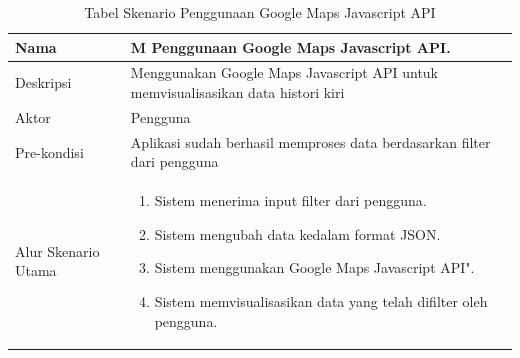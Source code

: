 \begin{table}[H]
    \centering
    \caption{Tabel Skenario Penggunaan Google Maps Javascript API}
    \begin{tabular}{|p{3cm}|p{10cm}|}
    \hline
        Nama & M Penggunaan Google Maps Javascript API.\\
    \hline
    \hline
        Deskripsi &  Menggunakan Google Maps Javascript API untuk memvisualisasikan data histori kiri \\
    \hline
        Aktor & Pengguna \\
    \hline
        Pre-kondisi & Aplikasi sudah berhasil memproses data berdasarkan filter dari pengguna\\
    \hline
        Alur Skenario Utama & 
        \begin{enumerate}
            \item Sistem menerima input filter dari pengguna.
            \item Sistem mengubah data kedalam format JSON.
            \item Sistem menggunakan Google Maps Javascript API".
            \item Sistem memvisualisasikan data yang telah difilter oleh pengguna.
        \end{enumerate}\\
    \hline
    \end{tabular}
    \label{tab:skenario1}
\end{table}